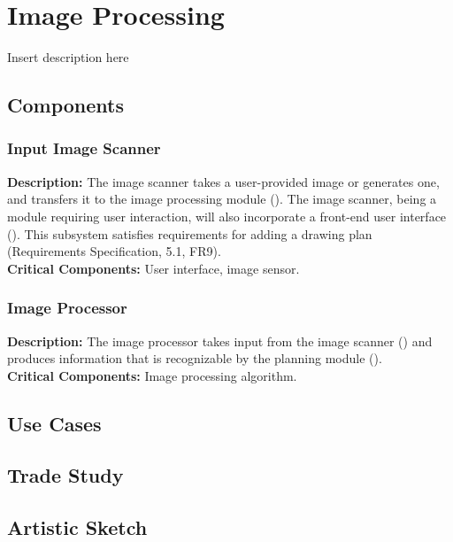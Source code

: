 
\section{Image Processing}
\label{sec:image_processing}
Insert description here

\subsection{Components}

\subsubsection{Input Image Scanner}
\label{sec:subsystem_input_scanner}
\textbf{Description:} The image scanner takes a user-provided image or generates one, and transfers it to the image processing module (). The image scanner, being a module requiring user interaction, will also incorporate a front-end user interface (). This subsystem satisfies requirements for adding a drawing plan (Requirements Specification, 5.1, FR9). \\
\textbf{Critical Components:} User interface, image sensor. \\

\subsubsection{Image Processor}
\label{sec:subsystem_image_processor}
\textbf{Description:} The image processor takes input from the image scanner () and produces information that is recognizable by the planning module (). \\
\textbf{Critical Components:} Image processing algorithm. \\

\subsection{Use Cases}

\subsection{Trade Study}

\subsection{Artistic Sketch}
